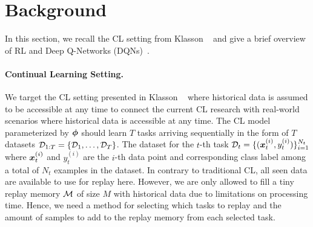 
\section{Background}\label{paperD:sec:background}

In this section, we recall the CL setting from Klasson \etal~\cite{D:klasson2021learn} and give a brief overview of RL and Deep Q-Networks (DQNs)~.


\vspace{-3mm}
\paragraph{Continual Learning Setting.} We target the CL setting presented in Klasson \etal~ where historical data is assumed to be accessible at any time to connect the current CL research with real-world scenarios where historical data is accessible at any time. The CL model parameterized by ${\bm{\phi}}$ should learn $T$ tasks arriving sequentially in the form of $T$ datasets ${\mathcal{D}}_{1:T} = \{{\mathcal{D}}_1, \dots, {\mathcal{D}}_T\}$. The dataset for the $t$-th task ${\mathcal{D}}_t = \{({\bm{x}}_t^{(i)}, y_t^{(i)})\}_{i=1}^{N_t}$ where ${\bm{x}}_t^{(i)}$ and $y_t^{(i)}$ are the $i$-th data point and corresponding class label among a total of $N_t$ examples in the dataset. In contrary to traditional CL, all seen data are available to use for replay here. However, we are only allowed to fill a tiny replay memory ${\mathcal{M}}$ of size $M$ with historical data due to limitations on processing time. Hence, we need a method for selecting which tasks to replay and the amount of samples to add to the replay memory from each selected task. 



